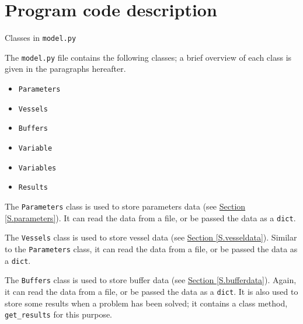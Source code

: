%
%
%
%

\chapter{Program code description}\label{C.Appendix2}

{\Large Classes in \texttt{model.py}}

The \texttt{model.py} file contains the following classes; a brief overview of
each class is given in the paragraphs hereafter.
\begin{itemize}
    \item \texttt{Parameters}
    \item \texttt{Vessels}
    \item \texttt{Buffers}
    \item \texttt{Variable}
    \item \texttt{Variables}
    \item \texttt{Results}
\end{itemize}

The \texttt{Parameters} class is used to store parameters data (see 
\hyperref[S.parameters]{Section \ref*{S.parameters}}). 
It can read the data from a file, or be passed the data as a \texttt{dict}.

The \texttt{Vessels} class is used to store vessel data (see 
\hyperref[S.vesseldata]{Section \ref*{S.vesseldata}}).
Similar to the \texttt{Parameters} class, it can read the data from a file, or
be passed the data as a \texttt{dict}.

The \texttt{Buffers} class is used to store buffer data (see 
\hyperref[S.bufferdata]{Section \ref*{S.bufferdata}}). 
Again, it can read the data from a file, or be passed the data as a
\texttt{dict}. It is also used to store some results when a problem has been
solved; it contains a class method, \texttt{get\_results} for this purpose.

